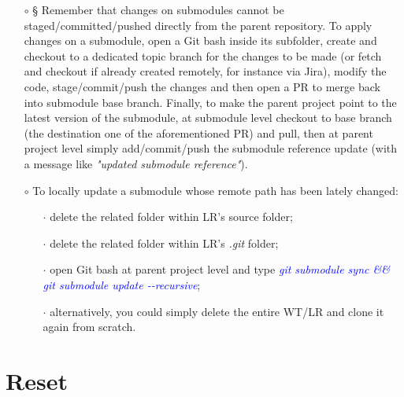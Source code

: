 \documentclass[a4paper,portrait,10pt]{article}   %
\newcommand{\mybulletlvA}{$\circ$}   %
\newcommand{\mybulletlvB}{$\cdot$}   %
\newcommand{\mycmd}[1]{\textcolor{blue}{\textit{#1}}}   %
\newcommand{\myparvspace}{\vspace{4mm}}   %
\newcommand{\mysecvspace}{\vspace{6mm}}   %
\begin{document}
\begin{itemize}
\item[\mybulletlvA] § Remember that changes on submodules cannot be staged/committed/pushed directly from the parent repository. To apply changes on a submodule, open a Git bash inside its subfolder, create and checkout to a dedicated topic branch for the changes to be made (or fetch and checkout if already created remotely, for instance via Jira), modify the code, stage/commit/push the changes and then open a PR to merge back into submodule base branch. Finally, to make the parent project point to the latest version of the submodule, at submodule level checkout to base branch (the destination one of the aforementioned PR) and pull, then at parent project level simply add/commit/push the submodule reference update (with a message like \textit{"updated submodule reference"}).
\myparvspace

\item[\mybulletlvA] To locally update a submodule whose remote path has been lately changed:
\begin{itemize}
  \item[\mybulletlvB] delete the related folder within LR's source folder;
  \item[\mybulletlvB] delete the related folder within LR's \textit{.git} folder;
  \item[\mybulletlvB] open Git bash at parent project level and type \mycmd{git submodule sync \&\& git submodule update -{}-recursive};
  \item[\mybulletlvB] alternatively, you could simply delete the entire WT/LR and clone it again from scratch.
\end{itemize}
\end{itemize}
\mysecvspace


\section{Reset}   \label{sec:Reset}
\end{document}
